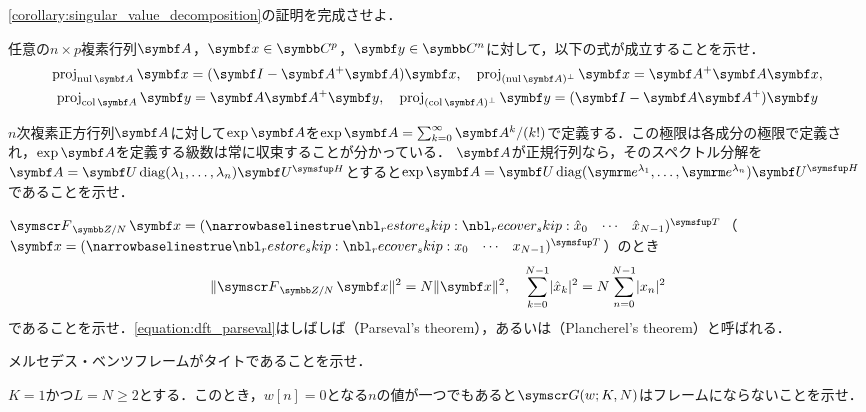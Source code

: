 \documentclass[../../main]{subfiles}
\begin{document}
\begin{problemenum}
  \item \cref{corollary:singular_value_decomposition}の証明を完成させよ．
  \item 任意の\(n\times p\)複素行列\(\mat{A}\)，\(\vect{x}\in\numset{C}^p\)，\(\vect{y}\in\numset{C}^n\)に対して，以下の式が成立することを示せ．
    \begin{gather*}
      \proj_{\nulsp\mat{A}}\vect{x} = (\imat-\pinv{\mat{A}}\mat{A})\vect{x},
      \quad\proj_{\pcomp{(\nulsp\mat{A})}}\vect{x} = \pinv{\mat{A}}\mat{A}\vect{x}, \\
      \proj_{\colsp\mat{A}}\vect{y} = \mat{A}\pinv{\mat{A}}\vect{y},
      \quad\proj_{\pcomp{(\colsp\mat{A})}}\vect{y} = (\imat-\mat{A}\pinv{\mat{A}})\vect{y}
    \end{gather*}
  \item \(n\)次複素正方行列\(\mat{A}\)に対して\(\exp\mat{A}\)を\(\exp\mat{A}=\sum_{k=0}^\infty\mat{A}^k/(k!)\)で定義する．この極限は各成分の極限で定義され，\(\exp\mat{A}\)を定義する級数は常に収束することが分かっている．
    \(\mat{A}\)が正規行列なら，そのスペクトル分解を\(\mat{A}=\mat{U}\diag(\lambda_1,\dots,\lambda_n)\htrps{\mat{U}}\)とすると\(\exp\mat{A}=\mat{U}\diag(\napr^{\lambda_1},\dots,\napr^{\lambda_n})\htrps{\mat{U}}\)であることを示せ．
  \item \label{problem:parseval}\(\dft{N}\vect{x}=\trps{\rowvect{\hat{x}_0 & \cdots & \hat{x}_{N-1}}}\)（\(\vect{x}=\trps{\rowvect{x_0 & \cdots & x_{N-1}}}\)）のとき
    \begin{equation}
      \label{equation:dft_parseval}
      \vnorm{\dft{N}\vect{x}}^2 = N\vnorm{\vect{x}}^2,
      \quad \sum_{k=0}^{N-1}\abs{\hat{x}_k}^2 = N\sum_{n=0}^{N-1}\abs{x_n}^2
    \end{equation}
    であることを示せ．\cref{equation:dft_parseval}はしばしば（Parseval's theorem），あるいは（Plancherel's theorem）と呼ばれる．
  \item \label{problem:mercedes_benz}メルセデス・ベンツフレームがタイトであることを示せ．
  \item \label{problem:gabor}\(K=1\)かつ\(L=N\geq 2\)とする．このとき，\(w[n]=0\)となる\(n\)の値が一つでもあると\(\gaborsys{w}{K}{N}\)はフレームにならないことを示せ．
\end{problemenum}
\end{document}
